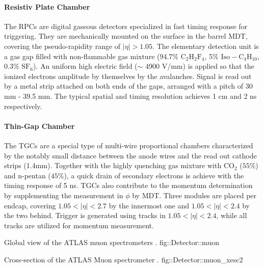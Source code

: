 \paragraph{Resistiv Plate Chamber}
The RPCs are digital gaseous detectors specialized in fast timing response for triggering.
They are mechanically mounted on the surface in the barrel MDT, covering the pseudo-rapidity range of $|\eta|>1.05$.
The elementary detection unit is a gas gap filled with non-flammable gas mixture (94.7$\%$ $\mathrm{C_2 H_2 F_4}$, 5$\%$ $\mathrm{Iso-C_4 H_10}$, 0.3$\%$ $\mathrm{SF_6}$). An uniform high electric field ($\sim$ 4900 V/mm) is applied so that the ionized electrons amplitude by themselves by the avalanches. Signal is read out by a metal strip attached on both ends of the gaps, arranged with a pitch of 30 mm - 39.5 mm.
The typical spatial and timing resolution achieves 1 cm and 2 ns respectively.



\paragraph{Thin-Gap Chamber}
The TGCs are a special type of multi-wire proportional chambers characterized by the notably small distance between the anode wires and the read out cathode strips (1.4mm).
Together with the highly quenching gas mixture with $\mathrm{CO_{2}}$ ($55\%$) and n-pentan ($45\%$), a quick drain of secondary electrons is achieve with the timing response of 5 ns. TGCs also contribute to the momentum determination by supplementing the measurement in $\phi$ by MDT.
Three modules are placed per endcap, covering $1.05<|\eta|<2.7$ by the innermost one and $1.05<|\eta|<2.4$ by the two behind. Trigger is generated using tracks in $1.05<|\eta|<2.4$, while all tracks are utilized for momentum measurement.


{Global view of the ATLAS muon spectrometers \cite{ATLAS_exp}.}
{fig::Detector::muon}


{Cross-section of the ATLAS Muon spectrometer \cite{ATLAScosmicPerf}.}
{fig::Detector::muon_xesc2}



